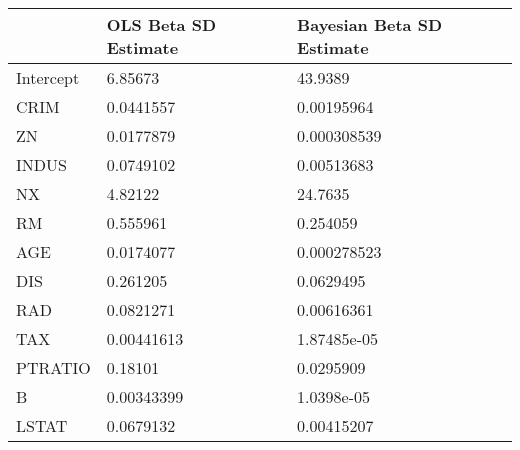 \begin{tabular}{lll}
\hline
           & OLS Beta SD Estimate   & Bayesian Beta SD Estimate   \\
\hline
 Intercept & 6.85673                & 43.9389                     \\
 CRIM      & 0.0441557              & 0.00195964                  \\
 ZN        & 0.0177879              & 0.000308539                 \\
 INDUS     & 0.0749102              & 0.00513683                  \\
 NX        & 4.82122                & 24.7635                     \\
 RM        & 0.555961               & 0.254059                    \\
 AGE       & 0.0174077              & 0.000278523                 \\
 DIS       & 0.261205               & 0.0629495                   \\
 RAD       & 0.0821271              & 0.00616361                  \\
 TAX       & 0.00441613             & 1.87485e-05                 \\
 PTRATIO   & 0.18101                & 0.0295909                   \\
 B         & 0.00343399             & 1.0398e-05                  \\
 LSTAT     & 0.0679132              & 0.00415207                  \\
\hline
\end{tabular}